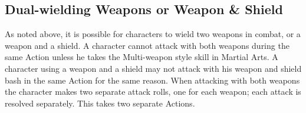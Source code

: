 \documentclass[twoside]{book}
\begin{document}
\subsection{Dual-wielding Weapons or Weapon \& Shield}
     As noted above, it is possible for characters to
               wield two weapons in combat, or a weapon and a shield. A
               character cannot attack with both weapons during the same
               Action unless he takes the Multi-weapon style skill in
               Martial Arts. A character using a weapon and a shield may
               not attack with his weapon and shield bash in the same
               Action for the same reason. When attacking with both
               weapons the character makes two separate attack rolls, one
               for each weapon; each attack is resolved separately. This
               takes two separate Actions. 
\end{document}
